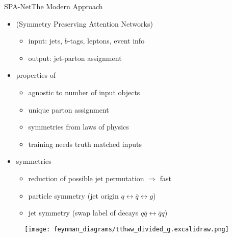 \documentclass[9pt, aspectratio=169]{beamer}
\begin{document}
\begin{frame}{SPA-Net}{The Modern Approach}
	\begin{minipage}{.58\textwidth}
		\begin{itemize}
			\item \spanet (Symmetry Preserving Attention Networks)
			\begin{itemize}
				\item input: jets, $b$-tags, leptons, event info
				\item output: jet-parton assignment
			\end{itemize}
			\item properties of \spanet
			\begin{itemize}
				\item agnostic to number of input objects
				\item unique parton assignment
				\item symmetries from laws of physics 
				\item training needs truth matched inputs
			\end{itemize}
			\item symmetries
			\begin{itemize}
				\item reduction of possible jet permutation $\Rightarrow$ fast
				\item particle symmetry (jet origin $q\leftrightarrow \bar{q}\leftrightarrow g$)
				\item jet symmetry (swap label of decays $q\bar{q}\leftrightarrow\bar{q}q$)
			\end{itemize}
		\end{itemize}
	  \end{minipage}\hfill
	  \begin{minipage}{.4\textwidth}
		  \begin{figure}
			  \centering
			  \texttt{[image: feynman\_diagrams/tthww\_divided\_g.excalidraw.png]}	
		  \end{figure}
	  \end{minipage}
\end{frame}
\end{document}
